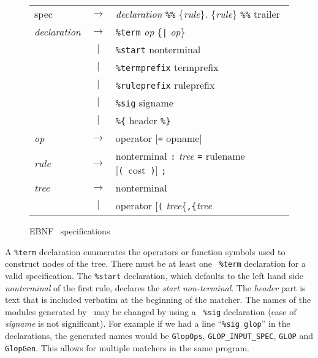 \begin{figure}[t]
\small
 \begin{center}
 \sl
 \begin{tabular}{lcl}
   spec	& $\rightarrow$ &  {\it declaration}
		   	   \verb.%%. \{{\it rule}\}
			   \verb.%%. trailer				\\[1ex]

   {\it declaration} 
	& $\rightarrow$ & {\tt \%term} {\it op} \{\verb.|. {\it op}\}	\\
    	& $\mid$	& {\tt \%start} nonterminal			\\
	& $\mid$	& {\tt \%termprefix} termprefix			\\
	& $\mid$	& {\tt \%ruleprefix} ruleprefix			\\
	& $\mid$	& {\tt \%sig} signame				\\
	& $\mid$	& \verb.%{. header \verb.%}.			\\[1ex]

   {\it op}
	& $\rightarrow$ & operator {\rm [}{\tt =} opname{\rm ]}		\\[1ex]

   {\it rule}
	& $\rightarrow$ & nonterminal \verb.:. {\it tree} \verb.=. 
			  rulename {\rm [}{\tt (~}cost{\tt ~)}{\rm ]} 
			  \verb.;.					\\[1ex]

   {\it tree}
	& $\rightarrow$ & nonterminal					\\[1ex]
	& $\mid$	& operator {\rm [}{\tt (}
			  {\it tree}\{\verb.,{.\it tree}\}{\tt ~)}{\rm ]}
 \end{tabular}
 \end{center}
\caption{EBNF \mlburg\ specifications}

\label{f:specification}
\end{figure}

A {\tt \%term} declaration enumerates the operators or function symbols
used to construct nodes of the tree.  There must be at least one {\tt
\%term} declaration for a valid specification.  The {\tt \%start}
declaration, which defaults to the left hand side {\sl nonterminal} of the
first rule, declares the {\em start non-terminal}. The {\sl header} part is
text that is included verbatim at the beginning of the matcher.  The names
of the modules generated by \mlburg\ may be changed by using a {\tt
\%sig} declaration (case of {\sl signame} is not significant).  For example
if we had a line ``\verb.%sig glop.'' in the declarations, the generated
names would be {\tt GlopOps}, {\tt GLOP\_INPUT\_SPEC}, {\tt GLOP} and {\tt
GlopGen}.  This allows for multiple matchers in the same program.

